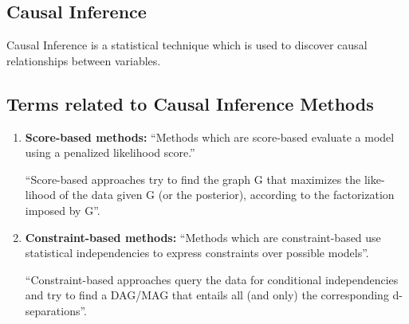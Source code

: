 \documentclass[11pt]{article}
\begin{document}
\subsection{Causal Inference}
Causal Inference is a statistical technique which is used to discover causal relationships between variables.

\subsection{Terms related to Causal Inference Methods}
\begin{enumerate}
    \item \textbf{Score-based methods:}
    ``Methods which are score-based evaluate a model using a penalized likelihood score.''\cite[p.~2]{jci} 
    
    
    ``Score-based approaches try to find the graph G that maximizes the like- lihood of the data given G (or the posterior), according to the factorization imposed by G''.\cite[p.~1]{triantafillouscore}
    
    \item \textbf{Constraint-based methods:}
    ``Methods which are constraint-based use statistical independencies to express constraints over possible models''.\cite[p.~2]{jci}
    
 
    
    ``Constraint-based approaches query the data for conditional independencies and try to find a DAG/MAG that entails all (and only) the corresponding d-separations''. \cite[p.~1]{triantafillouscore}
    
\end{enumerate}
\end{document}
